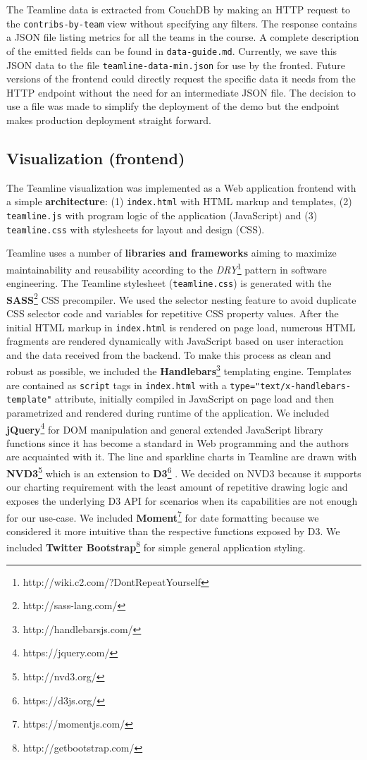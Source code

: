 \documentclass[../manifest.tex]{subfiles}
\begin{document}
The Teamline data is extracted from CouchDB by making an HTTP request to the \texttt{contribs-by-team} view without specifying any filters. The response contains a JSON file listing metrics for all the teams in the course. A complete description of the emitted fields can be found in \texttt{data-guide.md}. Currently, we save this JSON data to the file \texttt{teamline-data-min.json} for use by the fronted. Future versions of the frontend could directly request the specific data it needs from the HTTP endpoint without the need for an intermediate JSON file. The decision to use a file was made to simplify the deployment of the demo but the endpoint makes production deployment straight forward.


\subsection{Visualization (frontend)}
The Teamline visualization was implemented as a Web application frontend with a simple \textbf{architecture}: (1) \texttt{index.html} with HTML markup and templates, (2) \texttt{teamline.js} with program logic of the application (JavaScript) and (3) \texttt{teamline.css} with stylesheets for layout and design (CSS).

Teamline uses a number of \textbf{libraries and frameworks} aiming to maximize maintainability and reusability according to the \textit{DRY}\footnote{http://wiki.c2.com/?DontRepeatYourself} pattern in software engineering. The Teamline stylesheet (\texttt{teamline.css}) is generated with the \textbf{SASS}\footnote{http://sass-lang.com/} CSS precompiler. We used the selector nesting feature to avoid duplicate CSS selector code and variables for repetitive CSS property values. After the initial HTML markup in \texttt{index.html} is rendered on page load, numerous HTML fragments are rendered dynamically with JavaScript based on user interaction and the data received from the backend. To make this process as clean and robust as possible, we included the \textbf{Handlebars}\footnote{http://handlebarsjs.com/} templating engine. Templates are contained as \texttt{script} tags in \texttt{index.html} with a \texttt{type="text/x-handlebars-template"} attribute, initially compiled in JavaScript on page load and then parametrized and rendered during runtime of the application. We included \textbf{jQuery}\footnote{https://jquery.com/} for DOM manipulation and general extended JavaScript library functions since it has become a standard in Web programming and the authors are acquainted with it. The line and sparkline charts in Teamline are drawn with \textbf{NVD3}\footnote{http://nvd3.org/} which is an extension to \textbf{D3}\footnote{https://d3js.org/} \cite{d3}. We decided on NVD3 because it supports our charting requirement with the least amount of repetitive drawing logic and exposes the underlying D3 API for scenarios when its capabilities are not enough for our use-case. We included \textbf{Moment}\footnote{https://momentjs.com/} for date formatting because we considered it more intuitive than the respective functions exposed by D3. We included \textbf{Twitter Bootstrap}\footnote{http://getbootstrap.com/} for simple general application styling.
\end{document}
